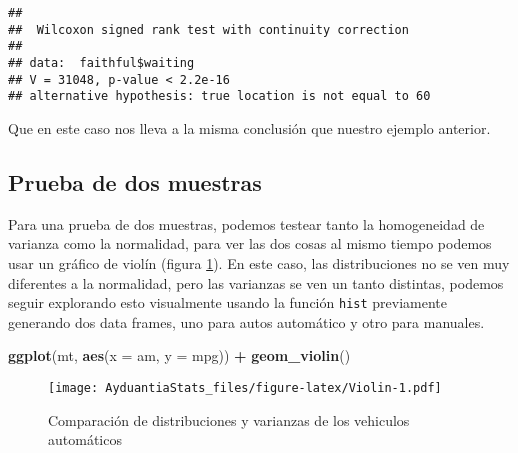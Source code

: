 \documentclass[]{book}
\newenvironment{Shaded}{\begin{snugshade}}{\end{snugshade}}
\newcommand{\DataTypeTok}[1]{\textcolor[rgb]{0.13,0.29,0.53}{#1}}
\newcommand{\DecValTok}[1]{\textcolor[rgb]{0.00,0.00,0.81}{#1}}
\newcommand{\KeywordTok}[1]{\textcolor[rgb]{0.13,0.29,0.53}{\textbf{#1}}}
\newcommand{\NormalTok}[1]{#1}
\newcommand{\OperatorTok}[1]{\textcolor[rgb]{0.81,0.36,0.00}{\textbf{#1}}}
\newcommand{\StringTok}[1]{\textcolor[rgb]{0.31,0.60,0.02}{#1}}
\begin{document}
\begin{verbatim}
## 
##  Wilcoxon signed rank test with continuity correction
## 
## data:  faithful$waiting
## V = 31048, p-value < 2.2e-16
## alternative hypothesis: true location is not equal to 60
\end{verbatim}

Que en este caso nos lleva a la misma conclusión que nuestro ejemplo anterior.

\hypertarget{prueba-de-dos-muestras}{%
\subsection{Prueba de dos muestras}\label{prueba-de-dos-muestras}}

Para una prueba de dos muestras, podemos testear tanto la homogeneidad de varianza como la normalidad, para ver las dos cosas al mismo tiempo podemos usar un gráfico de violín (figura \ref{fig:Violin}). En este caso, las distribuciones no se ven muy diferentes a la normalidad, pero las varianzas se ven un tanto distintas, podemos seguir explorando esto visualmente usando la función \texttt{hist} previamente generando dos data frames, uno para autos automático y otro para manuales.

\begin{Shaded}
\end{Shaded}

\begin{Shaded}
\begin{Highlighting}[]
\KeywordTok{ggplot}\NormalTok{(mt, }\KeywordTok{aes}\NormalTok{(}\DataTypeTok{x =}\NormalTok{ am, }\DataTypeTok{y =}\NormalTok{ mpg)) }\OperatorTok{+}\StringTok{ }\KeywordTok{geom_violin}\NormalTok{()}
\end{Highlighting}
\end{Shaded}

\begin{figure}
\centering
\texttt{[image: AyduantiaStats\_files/figure-latex/Violin-1.pdf]}
\caption{\label{fig:Violin}Comparación de distribuciones y varianzas de los vehiculos automáticos}
\end{figure}
\end{document}
